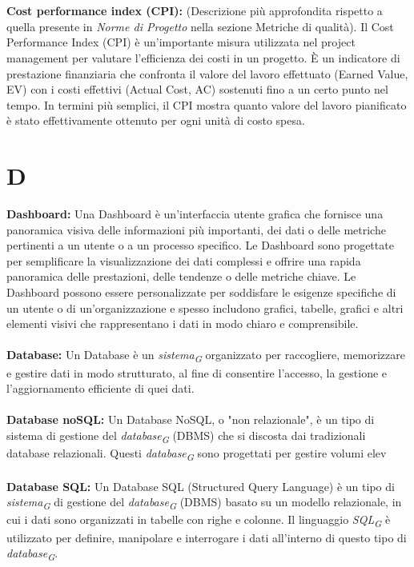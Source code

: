 \documentclass{article}
\begin{document}
\\
\\
\textbf{Cost performance index (CPI):} (Descrizione più approfondita rispetto a quella presente in \textit{Norme di Progetto} nella sezione Metriche di qualità). Il Cost Performance Index (CPI) è un'importante misura utilizzata nel project management per valutare l'efficienza dei costi in un progetto. È un indicatore di prestazione finanziaria che confronta il valore del lavoro effettuato (Earned Value, EV) con i costi effettivi (Actual Cost, AC) sostenuti fino a un certo punto nel tempo. In termini più semplici, il CPI mostra quanto valore del lavoro pianificato è stato effettivamente ottenuto per ogni unità di costo spesa.
\pagebreak
\section*{D}
{}
\textbf{Dashboard:} Una Dashboard è un'interfaccia utente grafica che fornisce una panoramica visiva delle informazioni più importanti, dei dati o delle metriche pertinenti a un utente o a un processo specifico. Le Dashboard sono progettate per semplificare la visualizzazione dei dati complessi e offrire una rapida panoramica delle prestazioni, delle tendenze o delle metriche chiave. Le Dashboard possono essere personalizzate per soddisfare le esigenze specifiche di un utente o di un'organizzazione e spesso includono grafici, tabelle, grafici e altri elementi visivi che rappresentano i dati in modo chiaro e comprensibile.
\\
\\
\textbf{Database:} Un Database è un \textit{sistema}\textsubscript{\textit{G}} organizzato per raccogliere, memorizzare e gestire dati in modo strutturato, al fine di consentire l'accesso, la gestione e l'aggiornamento efficiente di quei dati.
\\
\\
\textbf{Database noSQL:} Un Database NoSQL, o "non relazionale", è un tipo di sistema di gestione del \textit{database}\textsubscript{\textit{G}} (DBMS) che si discosta dai tradizionali database relazionali. Questi \textit{database}\textsubscript{\textit{G}} sono progettati per gestire volumi elev
\\
\\
\textbf{Database SQL:} Un Database SQL (Structured Query Language) è un tipo di \textit{sistema}\textsubscript{\textit{G}} di gestione del \textit{database}\textsubscript{\textit{G}} (DBMS) basato su un modello relazionale, in cui i dati sono organizzati in tabelle con righe e colonne. Il linguaggio \textit{SQL}\textsubscript{\textit{G}} è utilizzato per definire, manipolare e interrogare i dati all'interno di questo tipo di \textit{database}\textsubscript{\textit{G}}.
\end{document}
